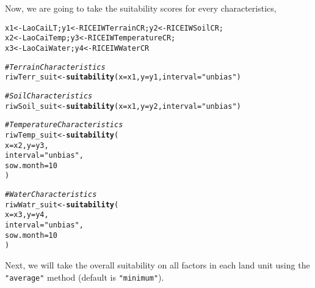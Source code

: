\documentclass[11pt,fleqn]{article}\usepackage[]{graphicx}\usepackage[]{color}
\makeatletter
\newcommand{\hlnum}[1]{\textcolor[rgb]{0.686,0.059,0.569}{#1}}%
\newcommand{\hlstr}[1]{\textcolor[rgb]{0.192,0.494,0.8}{#1}}%
\newcommand{\hlcom}[1]{\textcolor[rgb]{0.678,0.584,0.686}{\textit{#1}}}%
\newcommand{\hlstd}[1]{\textcolor[rgb]{0.345,0.345,0.345}{#1}}%
\newcommand{\hlkwb}[1]{\textcolor[rgb]{0.69,0.353,0.396}{#1}}%
\newcommand{\hlkwc}[1]{\textcolor[rgb]{0.333,0.667,0.333}{#1}}%
\newcommand{\hlkwd}[1]{\textcolor[rgb]{0.737,0.353,0.396}{\textbf{#1}}}%
\newenvironment{kframe}{%
 \def\at@end@of@kframe{}%
 \ifinner\ifhmode%
  \def\at@end@of@kframe{\end{minipage}}%
  \begin{minipage}{\columnwidth}%
 \fi\fi%
 \def\FrameCommand##1{\hskip\@totalleftmargin \hskip-\fboxsep
 \colorbox{shadecolor}{##1}\hskip-\fboxsep
     \hskip-\linewidth \hskip-\@totalleftmargin \hskip\columnwidth}%
 \MakeFramed {\advance\hsize-\width
   \@totalleftmargin\z@ \linewidth\hsize
   \@setminipage}}%
 {\par\unskip\endMakeFramed%
 \at@end@of@kframe}
\newenvironment{knitrout}{}{} %
\makeatother
\begin{document}
\noindent Now, we are going to take the suitability scores for every characteristics,
\begin{knitrout}
\color{fgcolor}\begin{kframe}
\begin{alltt}
\hlstd{x1} \hlkwb{<-} \hlstd{LaoCaiLT; y1} \hlkwb{<-} \hlstd{RICEIWTerrainCR; y2} \hlkwb{<-} \hlstd{RICEIWSoilCR;}
\hlstd{x2} \hlkwb{<-} \hlstd{LaoCaiTemp; y3} \hlkwb{<-} \hlstd{RICEIWTemperatureCR;}
\hlstd{x3} \hlkwb{<-} \hlstd{LaoCaiWater; y4} \hlkwb{<-} \hlstd{RICEIWWaterCR}

\hlcom{# Terrain Characteristics}
\hlstd{riwTerr_suit} \hlkwb{<-} \hlkwd{suitability}\hlstd{(}\hlkwc{x} \hlstd{= x1,} \hlkwc{y} \hlstd{= y1,} \hlkwc{interval} \hlstd{=} \hlstr{"unbias"}\hlstd{)}

\hlcom{# Soil Characteristics}
\hlstd{riwSoil_suit} \hlkwb{<-} \hlkwd{suitability}\hlstd{(}\hlkwc{x} \hlstd{= x1,} \hlkwc{y} \hlstd{= y2,} \hlkwc{interval} \hlstd{=} \hlstr{"unbias"}\hlstd{)}

\hlcom{# Temperature Characteristics}
\hlstd{riwTemp_suit} \hlkwb{<-} \hlkwd{suitability}\hlstd{(}
  \hlkwc{x} \hlstd{= x2,} \hlkwc{y} \hlstd{= y3,}
  \hlkwc{interval} \hlstd{=} \hlstr{"unbias"}\hlstd{,}
  \hlkwc{sow.month} \hlstd{=} \hlnum{10}
  \hlstd{)}

\hlcom{# Water Characteristics}
\hlstd{riwWatr_suit} \hlkwb{<-} \hlkwd{suitability}\hlstd{(}
  \hlkwc{x} \hlstd{= x3,} \hlkwc{y} \hlstd{= y4,}
  \hlkwc{interval} \hlstd{=} \hlstr{"unbias"}\hlstd{,}
  \hlkwc{sow.month} \hlstd{=} \hlnum{10}
  \hlstd{)}
\end{alltt}
\end{kframe}
\end{knitrout}
\noindent Next, we will take the overall suitability on all factors in each land unit using the \verb|"average"| method (default is \verb|"minimum"|).
\end{document}
